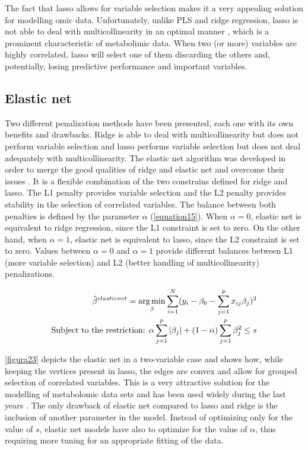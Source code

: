 The fact that lasso allows for variable selection makes it a very appealing solution for modelling omic data. Unfortunately, unlike PLS and ridge regression, lasso is not able to deal with multicollinearity in an optimal manner \parencite{chong2005performance}, which is a prominent characteristic of metabolimic data. When two (or more) variables are highly correlated, lasso will select one of them discarding the others and, potentially, losing predictive performance and important variables.

\subsection{Elastic net}
Two different penalization methods have been presented, each one with its own benefits and drawbacks. Ridge is able to deal with multicollinearity but does not perform variable selection and lasso performs variable selection but does not deal adequately with multicollinearity. The elastic net algorithm was developed in order to merge the good qualities of ridge and elastic net and overcome their issues \parencite{zou2005regularization}. It is a flexible combination of the two constrains defined for ridge and lasso. The L1 penalty provides variable selection and the L2 penalty provides stability in the selection of correlated variables. The balance between both penalties is defined by the parameter $\alpha$  (\autoref{equation15}). When $\alpha=0$, elastic net is equivalent to ridge regression, since the L1 constraint is set to zero. On the other hand, when $\alpha=1$, elastic net is equivalent to lasso, since the L2 constraint is set to zero. Values between $\alpha = 0$ and $\alpha = 1$ provide different balances between L1 (more variable selection) and L2 (better handling of multicollinearity) penalizations.

\begin{equation}
\label{equation15}
\begin{split}
\hat{\beta}^{elastic net}=\operatorname*{arg\,min}_\beta \sum\limits_{i=1}^N (y_{i}-\beta_{0}-\sum\limits_{j=1}^p x_{ij}\beta_{j})^{2} \\
\textrm{Subject to the restriction: }  \alpha \sum\limits_{j=1}^p |\beta_{j}| + (1-\alpha) \sum\limits_{j=1}^p \beta_{j}^2 \leq s
\end{split}
\end{equation}

\autoref{figura23} depicts the elastic net in a two-variable case and shows how, while keeping the vertices present in lasso, the edges are convex and allow for grouped selection of correlated variables. This is a very attractive solution for the modelling of metabolomic data sets and has been used widely during the last years \parencite{lankinen2010dietary, bowling2014analyzing, liu2015high, ferrario2016mortality}. The only drawback of elastic net compared to lasso and ridge is the inclusion of another parameter in the model. Instead of optimizing only for the value of $s$, elastic net models have also to optimize for the value of $\alpha$, thus requiring more tuning for an appropriate fitting of the data. 

